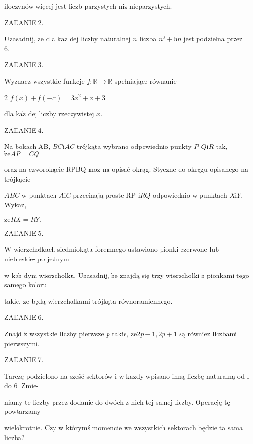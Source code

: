 \documentclass[a4paper,12pt]{article}
\begin{document}
iloczynów więcej jest liczb parzystych $\mathrm{n}\mathrm{i}\dot{\mathrm{z}}$ nieparzystych.

ZADANIE 2.

Uzasadnij, $\dot{\mathrm{z}}\mathrm{e}$ dla $\mathrm{k}\mathrm{a}\dot{\mathrm{z}}$ dej liczby naturalnej $n$ liczba $n^{3}+5n$ jest podzielna przez 6.

ZADANIE 3.

Wyznacz wszystkie funkcje $f:\mathbb{R}\rightarrow \mathbb{R}$ spełniające równanie

2 $f(x)+f(-x)=3x^{2}+x+3$

dla $\mathrm{k}\mathrm{a}\dot{\mathrm{z}}$ dej liczby rzeczywistej $x.$

ZADANIE 4.

Na bokach AB, $BC\mathrm{i}AC$ trójkąta wybrano odpowiednio punkty $P, Q\mathrm{i}R$ tak, $\dot{\mathrm{z}}\mathrm{e}AP=CQ$

oraz na czworokącie RPBQ $\mathrm{m}\mathrm{o}\dot{\mathrm{z}}$ na opisać okrąg. Styczne do okręgu opisanego na trójkącie

$ABC$ w punktach $A\mathrm{i}C$ przecinają proste RP $\mathrm{i}RQ$ odpowiednio w punktach $X\mathrm{i}Y$. Wykaz,

$\dot{\mathrm{z}}\mathrm{e}RX=RY.$

ZADANIE 5.

$\mathrm{W}$ wierzchołkach siedmiokąta foremnego ustawiono pionki czerwone lub niebieskie- po jednym

w $\mathrm{k}\mathrm{a}\dot{\mathrm{z}}$ dym wierzcholku. Uzasadnij, $\dot{\mathrm{z}}\mathrm{e}$ znajdą się trzy wierzchołki z pionkami tego samego koloru

takie, $\dot{\mathrm{z}}\mathrm{e}$ będą wierzcholkami trójkąta równoramiennego.

ZADANIE 6.

Znajd $\acute{\mathrm{z}}$ wszystkie liczby pierwsze $p$ takie, $\dot{\mathrm{z}}\mathrm{e}2p-1, 2p+1$ są równiez liczbami pierwszymi.

ZADANIE 7.

Tarczę podzielono na szešć sektorów i w $\mathrm{k}\mathrm{a}\dot{\mathrm{z}}\mathrm{d}\mathrm{y}$ wpisano inną liczbę naturalną od l do 6. Zmie-

niamy te liczby przez dodanie do dwóch z nich tej samej liczby. Operację tę powtarzamy

wielokrotnie. Czy w którymś momencie we wszystkich sektorach będzie ta sama liczba?
\end{document}
